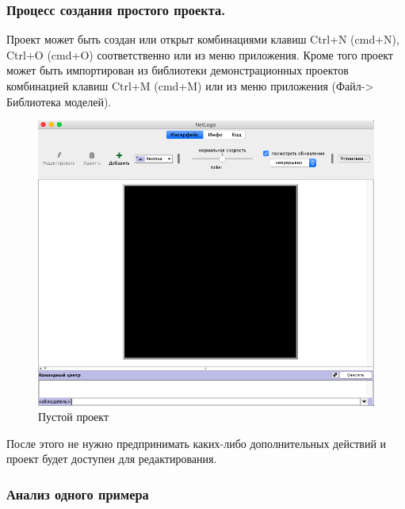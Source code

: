 \documentclass[14pt,a4paper,report]{report}
\begin{document}
\subsubsection{Процесс создания простого проекта.}

Проект может быть создан или открыт комбинациями клавиш Ctrl+N (cmd+N), Ctrl+O (cmd+O) соответственно или из меню приложения. Кроме того проект может быть импортирован из библиотеки демонстрационных проектов комбинацией клавиш Ctrl+M (cmd+M) или из меню приложения (Файл-> Библиотека моделей).

\begin{figure}[h!]
	\centering
	\includegraphics[scale = 0.33]{images/1.png}
	\caption{Пустой проект}
\end{figure}

После этого не нужно предпринимать каких-либо дополнительных действий и проект будет доступен для редактирования.

\subsubsection{Анализ одного примера}
\end{document}
